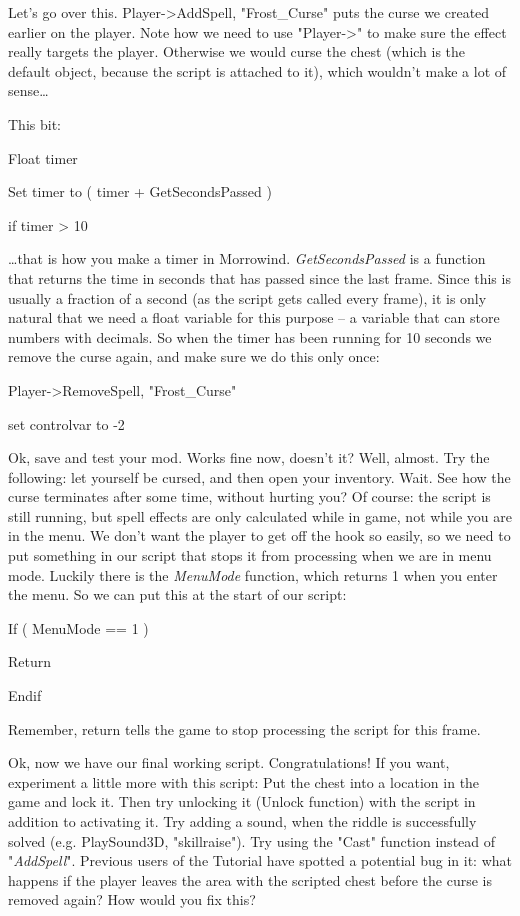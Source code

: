 \documentclass[
]{article}
\begin{document}


Let's go over this. Player-\textgreater AddSpell, "Frost\_Curse" puts
the curse we created earlier on the player. Note how we need to use
"Player-\textgreater" to make sure the effect really targets the player.
Otherwise we would curse the chest (which is the default object, because
the script is attached to it), which wouldn't make a lot of
sense\ldots{}


This bit:

Float timer

Set timer to ( timer + GetSecondsPassed )

if timer \textgreater{} 10

\ldots that is how you make a timer in Morrowind.
\emph{GetSecondsPassed} is a function that returns the time in seconds
that has passed since the last frame. Since this is usually a fraction
of a second (as the script gets called every frame), it is only natural
that we need a float variable for this purpose -- a variable that can
store numbers with decimals. So when the timer has been running for 10
seconds we remove the curse again, and make sure we do this only once:

Player-\textgreater RemoveSpell, "Frost\_Curse"

set controlvar to -2

Ok, save and test your mod. Works fine now, doesn't it? Well, almost.
Try the following: let yourself be cursed, and then open your inventory.
Wait. See how the curse terminates after some time, without hurting you?
Of course: the script is still running, but spell effects are only
calculated while in game, not while you are in the menu. We don't want
the player to get off the hook so easily, so we need to put something in
our script that stops it from processing when we are in menu mode.
Luckily there is the \emph{MenuMode} function, which returns 1 when you
enter the menu. So we can put this at the start of our script:

If ( MenuMode == 1 )

Return

Endif

Remember, return tells the game to stop processing the script for this
frame.

Ok, now we have our final working script. Congratulations! If you want,
experiment a little more with this script: Put the chest into a location
in the game and lock it. Then try unlocking it (Unlock function) with
the script in addition to activating it. Try adding a sound, when the
riddle is successfully solved (e.g. PlaySound3D, "skillraise"). Try
using the "Cast" function instead of "\emph{AddSpell}". Previous users
of the Tutorial have spotted a potential bug in it: what happens if the
player leaves the area with the scripted chest before the curse is
removed again? How would you fix this?
\end{document}
